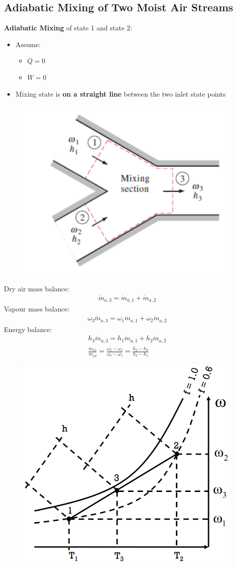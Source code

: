 \documentclass[class=report, crop=false, 12pt,a4paper]{standalone}
\numberwithin{equation}{section}
\begin{document}
\subsection{Adiabatic Mixing of Two Moist Air Streams}
\textbf{Adiabatic Mixing} of state 1 and state 2:
\begin{itemize}[noitemsep]
  \item Assume:
  \begin{itemize}[noitemsep]
    \item $\dot{Q} = 0$
    \item $\dot{W} = 0$
  \end{itemize}
  \item Mixing state is \textbf{on a straight line} between the two inlet state points
\end{itemize}
\begin{figure}[H]
  \centering
  \includegraphics[width = 0.5 \textwidth]{../img/diagram123.png}
  \caption{}
\end{figure}
Dry air mass balance:
\begin{gather}
  \dot{m}_{a,3} = \dot{m}_{a,1} + \dot{m}_{a,2}
\end{gather}
Vapour mass balance:
\begin{gather}
  \omega_3\dot{m}_{a,3} = \omega_1\dot{m}_{a,1} + \omega_2\dot{m}_{a,2}
\end{gather}
Energy balance:
\begin{gather}
  h_3\dot{m}_{a,3} = h_1\dot{m}_{a,1} + h_2\dot{m}_{a,2} \\[5pt]
  \frac{\dot{m}_{a1}}{\dot{m}_{a2}} = \frac{\omega_2-\omega_3}{\omega_3-\omega_1} = \frac{h_2-h_3}{h_3-h_1}
\end{gather}
\begin{figure}[H]
  \centering
  \includegraphics[width = 0.6 \textwidth]{../img/diagram124.png}
  \caption{}
\end{figure}
\end{document}
